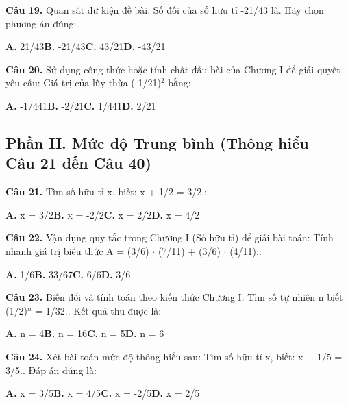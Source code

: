 \documentclass[11pt,a4paper]{article}
\begin{document}
\textbf{\color{primary} Câu 19.} Quan sát dữ kiện đề bài: Số đối của số hữu tỉ -21/43 là. Hãy chọn phương án đúng:\par
\hspace*{1.5em}\textbf{A.} 21/43\quad\quad \textbf{B.} -21/43\quad\quad \textbf{C.} 43/21\quad\quad \textbf{D.} -43/21\par\vspace{2pt}
\textbf{\color{primary} Câu 20.} Sử dụng công thức hoặc tính chất đầu bài của Chương I để giải quyết yêu cầu: Giá trị của lũy thừa (-1/21)$^2$ bằng:\par
\hspace*{1.5em}\textbf{A.} -1/441\quad\quad \textbf{B.} -2/21\quad\quad \textbf{C.} 1/441\quad\quad \textbf{D.} 2/21\par\vspace{2pt}
\subsection*{\color{accent} Phần II. Mức độ Trung bình (Thông hiểu -- Câu 21 đến Câu 40)}
\textbf{\color{primary} Câu 21.} Tìm số hữu tỉ x, biết: x + 1/2 = 3/2.:\par
\hspace*{1.5em}\textbf{A.} x = 3/2\quad\quad \textbf{B.} x = -2/2\quad\quad \textbf{C.} x = 2/2\quad\quad \textbf{D.} x = 4/2\par\vspace{2pt}
\textbf{\color{primary} Câu 22.} Vận dụng quy tắc trong Chương I (Số hữu tỉ) để giải bài toán: Tính nhanh giá trị biểu thức A = (3/6) $\cdot$ (7/11) + (3/6) $\cdot$ (4/11).:\par
\hspace*{1.5em}\textbf{A.} 1/6\quad\quad \textbf{B.} 33/67\quad\quad \textbf{C.} 6/6\quad\quad \textbf{D.} 3/6\par\vspace{2pt}
\textbf{\color{primary} Câu 23.} Biến đổi và tính toán theo kiến thức Chương I: Tìm số tự nhiên n biết (1/2)$^{n}$ = 1/32.. Kết quả thu được là:\par
\hspace*{1.5em}\textbf{A.} n = 4\quad\quad \textbf{B.} n = 16\quad\quad \textbf{C.} n = 5\quad\quad \textbf{D.} n = 6\par\vspace{2pt}
\textbf{\color{primary} Câu 24.} Xét bài toán mức độ thông hiểu sau: Tìm số hữu tỉ x, biết: x + 1/5 = 3/5.. Đáp án đúng là:\par
\hspace*{1.5em}\textbf{A.} x = 3/5\quad\quad \textbf{B.} x = 4/5\quad\quad \textbf{C.} x = -2/5\quad\quad \textbf{D.} x = 2/5\par\vspace{2pt}
\end{document}
